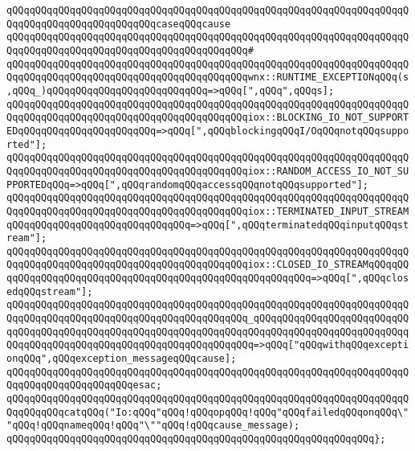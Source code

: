 \verb|qQQqqQQqqQQqqQQqqQQqqQQqqQQqqQQqqQQqqQQqqQQqqQQqqQQqqQQqqQQqqQQqqQQqqQQqqQQqqQQqqQQqqQQqqQQqqQQqcaseqQQqcause|\newline
\verb|qQQqqQQqqQQqqQQqqQQqqQQqqQQqqQQqqQQqqQQqqQQqqQQqqQQqqQQqqQQqqQQqqQQqqQQqqQQqqQQqqQQqqQQqqQQqqQQqqQQqqQQqqQQqqQQq#|\newline
\verb|qQQqqQQqqQQqqQQqqQQqqQQqqQQqqQQqqQQqqQQqqQQqqQQqqQQqqQQqqQQqqQQqqQQqqQQqqQQqqQQqqQQqqQQqqQQqqQQqqQQqqQQqqQQqqQQqwnx::RUNTIME_EXCEPTIONqQQq(s,qQQq_)qQQqqQQqqQQqqQQqqQQqqQQqqQQq=>qQQq[",qQQq",qQQqs];|\newline
\verb|qQQqqQQqqQQqqQQqqQQqqQQqqQQqqQQqqQQqqQQqqQQqqQQqqQQqqQQqqQQqqQQqqQQqqQQqqQQqqQQqqQQqqQQqqQQqqQQqqQQqqQQqqQQqqQQqiox::BLOCKING_IO_NOT_SUPPORTEDqQQqqQQqqQQqqQQqqQQqqQQq=>qQQq[",qQQqblockingqQQqI/OqQQqnotqQQqsupported"];|\newline
\verb|qQQqqQQqqQQqqQQqqQQqqQQqqQQqqQQqqQQqqQQqqQQqqQQqqQQqqQQqqQQqqQQqqQQqqQQqqQQqqQQqqQQqqQQqqQQqqQQqqQQqqQQqqQQqqQQqiox::RANDOM_ACCESS_IO_NOT_SUPPORTEDqQQq=>qQQq[",qQQqrandomqQQqaccessqQQqnotqQQqsupported"];|\newline
\verb|qQQqqQQqqQQqqQQqqQQqqQQqqQQqqQQqqQQqqQQqqQQqqQQqqQQqqQQqqQQqqQQqqQQqqQQqqQQqqQQqqQQqqQQqqQQqqQQqqQQqqQQqqQQqqQQqiox::TERMINATED_INPUT_STREAMqQQqqQQqqQQqqQQqqQQqqQQqqQQqqQQq=>qQQq[",qQQqterminatedqQQqinputqQQqstream"];|\newline
\verb|qQQqqQQqqQQqqQQqqQQqqQQqqQQqqQQqqQQqqQQqqQQqqQQqqQQqqQQqqQQqqQQqqQQqqQQqqQQqqQQqqQQqqQQqqQQqqQQqqQQqqQQqqQQqqQQqiox::CLOSED_IO_STREAMqQQqqQQqqQQqqQQqqQQqqQQqqQQqqQQqqQQqqQQqqQQqqQQqqQQqqQQqqQQq=>qQQq[",qQQqclosedqQQqstream"];|\newline
\verb|qQQqqQQqqQQqqQQqqQQqqQQqqQQqqQQqqQQqqQQqqQQqqQQqqQQqqQQqqQQqqQQqqQQqqQQqqQQqqQQqqQQqqQQqqQQqqQQqqQQqqQQqqQQqqQQq_qQQqqQQqqQQqqQQqqQQqqQQqqQQqqQQqqQQqqQQqqQQqqQQqqQQqqQQqqQQqqQQqqQQqqQQqqQQqqQQqqQQqqQQqqQQqqQQqqQQqqQQqqQQqqQQqqQQqqQQqqQQqqQQqqQQqqQQqqQQq=>qQQq["qQQqwithqQQqexceptionqQQq",qQQqexception_messageqQQqcause];|\newline
\verb|qQQqqQQqqQQqqQQqqQQqqQQqqQQqqQQqqQQqqQQqqQQqqQQqqQQqqQQqqQQqqQQqqQQqqQQqqQQqqQQqqQQqqQQqqQQqesac;|\newline
\newline
\verb|qQQqqQQqqQQqqQQqqQQqqQQqqQQqqQQqqQQqqQQqqQQqqQQqqQQqqQQqqQQqqQQqqQQqqQQqqQQqqQQqcatqQQq("Io:qQQq"qQQq!qQQqopqQQq!qQQq"qQQqfailedqQQqonqQQq\""qQQq!qQQqnameqQQq!qQQq"\""qQQq!qQQqcause_message);|\newline
\verb|qQQqqQQqqQQqqQQqqQQqqQQqqQQqqQQqqQQqqQQqqQQqqQQqqQQqqQQqqQQqqQQq};|\newline
